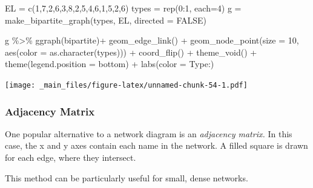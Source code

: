 \documentclass[
]{book}
\newenvironment{Shaded}{\begin{snugshade}}{\end{snugshade}}
\newcommand{\AttributeTok}[1]{\textcolor[rgb]{0.77,0.63,0.00}{#1}}
\newcommand{\ConstantTok}[1]{\textcolor[rgb]{0.00,0.00,0.00}{#1}}
\newcommand{\DecValTok}[1]{\textcolor[rgb]{0.00,0.00,0.81}{#1}}
\newcommand{\FunctionTok}[1]{\textcolor[rgb]{0.00,0.00,0.00}{#1}}
\newcommand{\NormalTok}[1]{#1}
\newcommand{\OtherTok}[1]{\textcolor[rgb]{0.56,0.35,0.01}{#1}}
\newcommand{\SpecialCharTok}[1]{\textcolor[rgb]{0.00,0.00,0.00}{#1}}
\newcommand{\StringTok}[1]{\textcolor[rgb]{0.31,0.60,0.02}{#1}}
\begin{document}
\begin{Shaded}
\begin{Highlighting}[]
\NormalTok{EL }\OtherTok{=} \FunctionTok{c}\NormalTok{(}\DecValTok{1}\NormalTok{,}\DecValTok{7}\NormalTok{,}\DecValTok{2}\NormalTok{,}\DecValTok{6}\NormalTok{,}\DecValTok{3}\NormalTok{,}\DecValTok{8}\NormalTok{,}\DecValTok{2}\NormalTok{,}\DecValTok{5}\NormalTok{,}\DecValTok{4}\NormalTok{,}\DecValTok{6}\NormalTok{,}\DecValTok{1}\NormalTok{,}\DecValTok{5}\NormalTok{,}\DecValTok{2}\NormalTok{,}\DecValTok{6}\NormalTok{)}
\NormalTok{types }\OtherTok{=} \FunctionTok{rep}\NormalTok{(}\DecValTok{0}\SpecialCharTok{:}\DecValTok{1}\NormalTok{, }\AttributeTok{each=}\DecValTok{4}\NormalTok{)}
\NormalTok{g }\OtherTok{=} \FunctionTok{make\_bipartite\_graph}\NormalTok{(types, EL, }\AttributeTok{directed =} \ConstantTok{FALSE}\NormalTok{)}

\NormalTok{g }\SpecialCharTok{\%\textgreater{}\%} \FunctionTok{ggraph}\NormalTok{(}\StringTok{\textquotesingle{}bipartite\textquotesingle{}}\NormalTok{)}\SpecialCharTok{+} 
  \FunctionTok{geom\_edge\_link}\NormalTok{() }\SpecialCharTok{+} 
  \FunctionTok{geom\_node\_point}\NormalTok{(}\AttributeTok{size =} \DecValTok{10}\NormalTok{, }\FunctionTok{aes}\NormalTok{(}\AttributeTok{color =} \FunctionTok{as.character}\NormalTok{(types)))  }\SpecialCharTok{+} \FunctionTok{coord\_flip}\NormalTok{() }\SpecialCharTok{+} \FunctionTok{theme\_void}\NormalTok{() }\SpecialCharTok{+} \FunctionTok{theme}\NormalTok{(}\AttributeTok{legend.position =} \StringTok{\textquotesingle{}bottom\textquotesingle{}}\NormalTok{) }\SpecialCharTok{+} \FunctionTok{labs}\NormalTok{(}\AttributeTok{color =} \StringTok{\textquotesingle{}Type:\textquotesingle{}}\NormalTok{)}
\end{Highlighting}
\end{Shaded}

\texttt{[image: \_main\_files/figure-latex/unnamed-chunk-54-1.pdf]}

\hypertarget{adjacency-matrix}{%
\subsubsection{Adjacency Matrix}\label{adjacency-matrix}}

One popular alternative to a network diagram is an \emph{adjacency matrix.} In this case, the x and y axes contain each name in the network. A filled square is drawn for each edge, where they intersect.

This method can be particularly useful for small, dense networks.
\end{document}
